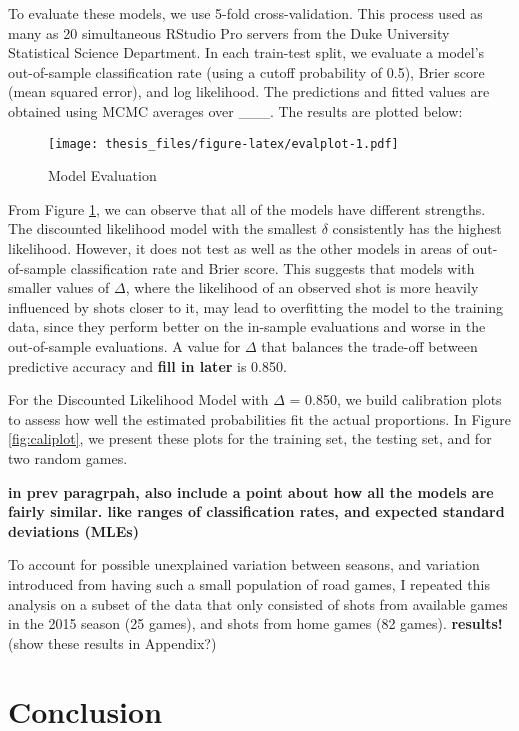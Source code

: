 \documentclass[12pt,twoside]{dukestatscithesis}
\theoremstyle{definition}
\theoremstyle{definition}
\theoremstyle{definition}
\theoremstyle{remark}
\begin{document}
To evaluate these models, we use 5-fold cross-validation. This process
used as many as 20 simultaneous RStudio Pro servers from the Duke
University Statistical Science Department. In each train-test split, we
evaluate a model's out-of-sample classification rate (using a cutoff
probability of 0.5), Brier score (mean squared error), and log
likelihood. The predictions and fitted values are obtained using MCMC
averages over \_\_\_. The results are plotted below:
\begin{figure}[htbp]
\centering
\texttt{[image: thesis\_files/figure-latex/evalplot-1.pdf]}
\caption{\label{fig:evalplot}Model Evaluation}
\end{figure}
From Figure \ref{fig:evalplot}, we can observe that all of the models
have different strengths. The discounted likelihood model with the
smallest \(\delta\) consistently has the highest likelihood. However, it
does not test as well as the other models in areas of out-of-sample
classification rate and Brier score. This suggests that models with
smaller values of \(\Delta\), where the likelihood of an observed shot
is more heavily influenced by shots closer to it, may lead to
overfitting the model to the training data, since they perform better on
the in-sample evaluations and worse in the out-of-sample evaluations. A
value for \(\Delta\) that balances the trade-off between predictive
accuracy and \textbf{fill in later} is 0.850.

For the Discounted Likelihood Model with \(\Delta\) = 0.850, we build
calibration plots to assess how well the estimated probabilities fit the
actual proportions. In Figure \ref{fig:caliplot}, we present these plots
for the training set, the testing set, and for two random games.

\textbf{in prev paragrpah, also include a point about how all the models
are fairly similar. like ranges of classification rates, and expected
standard deviations (MLEs)}

To account for possible unexplained variation between seasons, and
variation introduced from having such a small population of road games,
I repeated this analysis on a subset of the data that only consisted of
shots from available games in the 2015 season (25 games), and shots from
home games (82 games). \textbf{results!} (show these results in
Appendix?)

\section{Conclusion}\label{conclusion}
\end{document}
